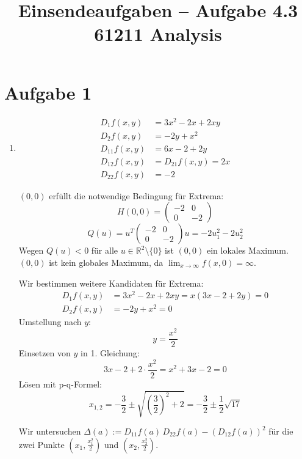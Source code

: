\documentclass[a4paper,12pt]{article}
\title{Einsendeaufgaben -- Aufgabe 4.3\\[0.5em]
\large 61211 Analysis}
\author{}
\date{}
\begin{document}
\maketitle

\section*{Aufgabe 1}

\begin{enumerate}[label=\alph*)]

    \item
    \begin{align*}
        D_1 f(x,y) &= 3x^2 - 2x + 2xy \\
        D_2 f(x,y) &= -2y + x^2 \\
        D_{11} f(x,y) &= 6x - 2 + 2y \\
        D_{12} f(x,y) &= D_{21} f(x,y) = 2x \\
        D_{22} f(x,y) &= -2
    \end{align*}

    $(0,0)$ erfüllt die notwendige Bedingung für Extrema:
    \[
        H(0,0) = \begin{pmatrix} -2 & 0 \\ 0 & -2 \end{pmatrix}
    \]
    \[
        Q(u) = u^T \begin{pmatrix} -2 & 0 \\ 0 & -2 \end{pmatrix} u = -2 u_1^2 - 2 u_2^2
    \]
    Wegen $Q(u) < 0$ für alle $u \in \mathbb{R}^2 \setminus \{0\}$ ist $(0,0)$ ein lokales Maximum. $(0,0)$ ist kein globales Maximum, da $\lim_{x \to \infty} f(x,0) = \infty$.

    Wir bestimmen weitere Kandidaten für Extrema:
    \begin{align*}
        D_1 f(x,y) &= 3x^2 - 2x + 2xy = x(3x - 2 + 2y) = 0 \\
        D_2 f(x,y) &= -2y + x^2 = 0
    \end{align*}
    Umstellung nach $y$:
    \[
        y = \frac{x^2}{2}
    \]
    Einsetzen von $y$ in 1. Gleichung:
    \[
        3x - 2 + 2 \cdot \frac{x^2}{2} = x^2 + 3x - 2 = 0
    \]
    Lösen mit p-q-Formel:
    \[
        x_{1,2} = -\frac{3}{2} \pm \sqrt{\left(\frac{3}{2}\right)^2 + 2} = -\frac{3}{2} \pm \frac{1}{2} \sqrt{17}
    \]

    Wir untersuchen $\Delta(a) := D_{11} f(a) \, D_{22} f(a) - (D_{12} f(a))^2$ für die zwei Punkte $\left(x_1, \frac{x_1^2}{2}\right)$ und $\left(x_2, \frac{x_2^2}{2}\right)$.


\end{enumerate}
\end{document}

